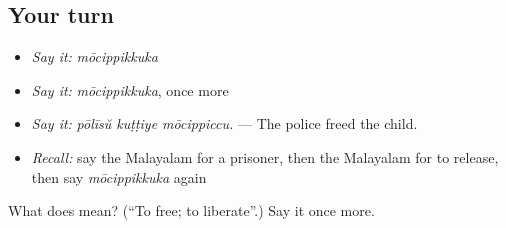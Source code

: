 \subsection*{Your turn}
\begin{itemize}
\raggedright
  \item \emph{Say it:} \emph{mōcippikkuka}
  \item \emph{Say it:} \emph{mōcippikkuka}, once more
  \item \emph{Say it:} \emph{pōlīsŭ kuṭṭiye mōcippiccu.} — The police freed the child.
  \item \emph{Recall:} say the Malayalam for a prisoner, then the Malayalam for to release, then say \emph{mōcippikkuka} again
\end{itemize}

\begin{tcolorbox}[breakable,colback=teal!4,colframe=teal!35!black,title={Before you move on}]
What does  mean? (\textquotedblleft{}To free; to liberate\textquotedblright{}.) Say it once more.
\end{tcolorbox}
